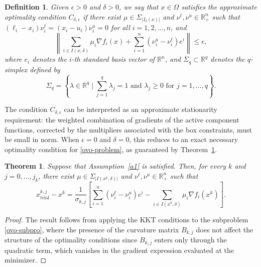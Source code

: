 \documentclass[11pt]{article}
\newtheorem{theorem}{Theorem}[section]
\newtheorem{definition}{Definition}[section]
\begin{document}
\begin{definition} \label{def:optcond}
Given $\epsilon > 0$ and $\delta > 0$, we say that $x \in \Omega$ 
satisfies the \textit{approximate optimality condition} $C_{\delta,\epsilon}$ 
if there exist $\mu \in \Sigma_{|I_\delta(x)|}$ and $\nu^\ell, \nu^u 
\in \mathbb{R}^n_+$ such that $(\ell_i - x_i)\nu_i^\ell = 
(x_i - u_i)\nu_i^u = 0$ for all $i = 1, 2, \ldots, n$, and
\begin{equation} \label{miaprox-box}
    \left\| \sum_{i \in I(x,\delta)} \mu_i \nabla f_i(x) 
    + \sum_{i=1}^{n} \left(\nu_i^u - \nu_i^\ell\right) e^i 
    \right\| \leq \epsilon,
\end{equation}
where $e_i$ denotes the $i$-th standard basis vector of $\mathbb{R}^n$, 
and $\Sigma_q \subset \mathbb{R}^q$ denotes the $q$-simplex defined by
\begin{equation*}
    \Sigma_q = \left\{ \lambda \in \mathbb{R}^q \mid 
    \sum_{j=1}^{q} \lambda_j = 1 \text{ and } \lambda_j \geq 0 
    \text{ for } j = 1, \ldots, q \right\}.
\end{equation*}
\end{definition}

The condition $C_{\delta,\epsilon}$ can be interpreted as an 
approximate stationarity requirement: the weighted combination of 
gradients of the active component functions, corrected by the 
multipliers associated with the box constraints, must be small in 
norm. When $\epsilon = 0$ and $\delta = 0$, this reduces to an 
exact necessary optimality condition for \eqref{ovo-problem}, as 
guaranteed by Theorem~\ref{teo:conv3}.

\begin{theorem} \label{teo:conv3}
Suppose that Assumption~\ref{a1} is satisfied. Then, for every $k$ 
and $j = 0, \ldots, j_k$, there exist $\mu \in \Sigma_{|I(x^k,\delta)|}$ 
and $\nu^\ell, \nu^u \in \mathbb{R}^n_+$ such that
\begin{equation} \label{eqcoro1}
    x_{\mathrm{trial}}^{k,j} - x^k = \frac{1}{\sigma_{k,j}} 
    \left[ \sum_{i=1}^{n} \left(\nu_i^\ell - \nu_i^u\right) e^i 
    - \sum_{i \in I(x^k,\delta)} \mu_i \nabla f_i(x^k) \right].
\end{equation}
\end{theorem}

\begin{proof}
The result follows from applying the 
KKT conditions to the subproblem \eqref{ovo-subpro}, where the 
presence of the curvature matrix $B_{k,j}$ does not affect the 
structure of the optimality conditions since $B_{k,j}$ enters 
only through the quadratic term, which vanishes in the gradient 
expression evaluated at the minimizer.
\end{proof}
\end{document}
